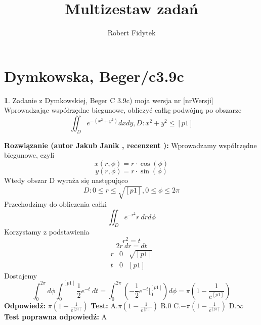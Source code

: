 \documentclass[12pt, a4paper]{article}
\title{Multizestaw zadań}
\author{Robert Fidytek}
\date{}
\theoremstyle{definition} %
\newtheorem{zad}{}
\newcommand{\kategoria}[1]{\section{#1}} %
\newcommand{\zadStart}[1]{\begin{zad}#1\newline} %
\newcommand{\zadStop}{\end{zad}}   %
\newcommand{\rozwStart}[2]{\noindent \textbf{Rozwiązanie (autor #1 , recenzent #2): }\newline} %
\newcommand{\rozwStop}{\newline}                                            %
\newcommand{\odpStart}{\noindent \textbf{Odpowiedź:}\newline}    %
\newcommand{\odpStop}{\newline}                                             %
\newcommand{\testStart}{\noindent \textbf{Test:}\newline} %
\newcommand{\testStop}{\newline} %
\newcommand{\kluczStart}{\noindent \textbf{Test poprawna odpowiedź:}\newline} %
\newcommand{\kluczStop}{\newline} %
\begin{document}
\maketitle


\kategoria{Dymkowska, Beger/c3.9c}
\zadStart{Zadanie z Dymkowskiej, Beger C 3.9c) moja wersja nr [nrWersji]}
Wprowadzając współrzędne biegunowe, obliczyć całkę podwójną po obszarze $$\iint_D e^{-(x^2+y^2)} dxdy, D: x^2+y^2 \leq [p1]$$
\zadStop
\rozwStart{Jakub Janik}{}
Wprowadzamy współrzędne biegunowe, czyli $$x(r,\phi)=r\cdot\cos{(\phi)}$$
$$y(r,\phi)=r\cdot\sin{(\phi)}$$
Wtedy obszar D wyraża się następująco $$D: 0 \leq r \leq \sqrt{[p1]}, 0 \leq \phi \leq 2\pi$$
Przechodzimy do obliczenia całki
$$\iint_D e^{-r^2}r\ drd\phi$$
Korzystamy z podstawienia $$r^2=t$$ 
$$ 2r\ dr=dt$$
\begin{displaymath}
\left.\begin{array}{c|c|c}
r & 0 & \sqrt{[p1]} \\ \hline
t & 0 & [p1]
\end{array}\right.
\end{displaymath}
Dostajemy
$$\int_0^{2\pi}d\phi\int_0^{[p1]}\frac{1}{2}e^{-t}\ dt=\int_0^{2\pi}(-\frac{1}{2}e^{-t}\Big|_0^{[p1]})d\phi=\pi(1-\frac{1}{e^{[p1]}})$$
\rozwStop
\odpStart
$\pi(1-\frac{1}{e^{[p1]}})$
\odpStop
\testStart
A.$\pi(1-\frac{1}{e^{[p1]}})$
B.$0$
C.$-\pi(1-\frac{1}{e^{[p1]}})$
D.$\infty$
\testStop
\kluczStart
A
\kluczStop
\end{document}
